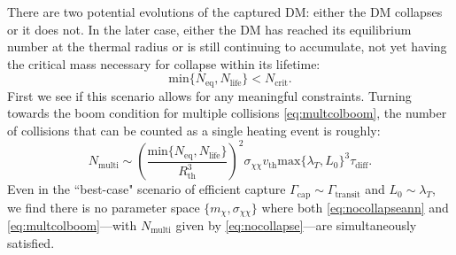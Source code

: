 \documentclass[preprintnumbers,amsmath,amssymb,prd,superscriptaddress]{revtex4}
\def\r{\right)}
\def\l{\left(}
\begin{document}
There are two potential evolutions of the captured DM: either the DM collapses or it does not. 
In the later case, either the DM has reached its equilibrium number at the thermal radius or is still continuing to accumulate, not yet having the critical mass necessary for collapse within its lifetime:
\begin{equation}
\label{eq:nocollapseann}
\text{min}\{N_\text{eq}, N_\text{life}\} < N_\text{crit}.
\end{equation}
First we see if this scenario allows for any meaningful constraints. 
Turning towards the boom condition for multiple collisions \eqref{eq:multcolboom}, the number of collisions that can be counted as a single heating event is roughly:
\begin{equation}
\label{eq:nocollapse}
N_\text{multi} \sim \l \frac{\text{min}\{N_\text{eq}, N_\text{life}\}}{R_\text{th}^3} \r^2 \sigma_{\chi \chi} v_\text{th} \text{max}\{\lambda_T,L_0\}^3 \tau_\text{diff}. 
\end{equation}
Even in the ``best-case" scenario of efficient capture $\Gamma_\text{cap} \sim \Gamma_\text{transit}$ and $L_0 \sim \lambda_T$, we find there is no parameter space $\{m_\chi, \sigma_{\chi \chi}\}$ where both \eqref{eq:nocollapseann} and \eqref{eq:multcolboom}---with $N_\text{multi}$ given by \eqref{eq:nocollapse}---are simultaneously satisfied. 
\end{document}
